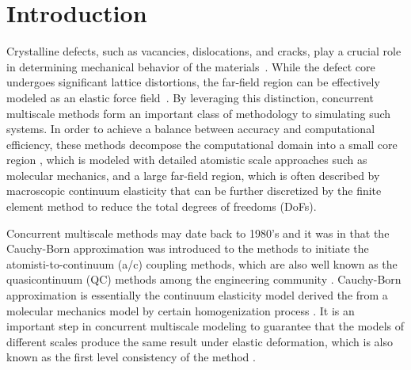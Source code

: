 \section{Introduction}
%
\label{sec: introduction}


Crystalline defects, such as vacancies, dislocations, and cracks, play a crucial role in determining mechanical behavior of the materials~\cite{1996_AC_Ana_Solid_Defect_PMA,2009_Miller_Tadmor_Unified_Framework_Benchmark_MSMSE,2020_EG_Roadmap_Multiscale_Modeling_MSMSE,2012_Tadmor_Material_Con_Ato_Multiscale, chen2022qm, wang2021posteriori, chen2019adaptive}. While the defect core undergoes significant lattice distortions, the far-field region can be effectively modeled as an elastic force field~\cite{2020_JB_MD_CO_Thermo_Limit_Trans_Rate_Crystalline_Defect_ARMA,1984_Daw_Baskes_EAM_PRB, braun2022higher, olson2023elastic}. By leveraging this distinction, concurrent multiscale methods form an important class of methodology to simulating such systems. In order to achieve a balance between accuracy and computational efficiency, these methods decompose the computational domain into a small core region , which is modeled with detailed atomistic scale approaches such as molecular mechanics, and a large far-field region, which is often described by macroscopic continuum elasticity that can be further discretized by the finite element method to reduce the total degrees of freedoms (DoFs).






Concurrent multiscale methods may date back to 1980's and it was in \cite{1996_AC_Ana_Solid_Defect_PMA} that the Cauchy-Born approximation was introduced to the methods to initiate the atomisti-to-continuum (a/c) coupling methods, which are also well known as the quasicontinuum (QC) methods among the engineering community \cite{2003_RM_ET_QCM_JCAMD,2009_Miller_Tadmor_Unified_Framework_Benchmark_MSMSE,2013_ML_CO_AC_Coupling_ACTANUM, fu2023adaptive, fu2025meshac, wang2025posteriori}. Cauchy-Born approximation is essentially the continuum elasticity model derived the from a molecular mechanics model by certain homogenization process \cite{2002_PL_QCL_1D_MATHCOMP,2007_WE_PM_Cauchy_Born_Rule_and_The_Stability_ARMA,2007_PL_QCL_2D_SIAMNUM,2012_TH_CO_CB_Stability_Bravi_Lattice_M2NA, wang2021priori}. It is an important step in concurrent multiscale modeling to guarantee that the models of different scales produce the same result under elastic deformation, which is also known as the first level consistency of the method \cite{2012_WE_Principles_Multi_Model}. 

